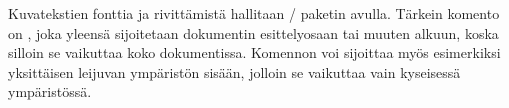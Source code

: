 \begin{koodilohkosis}
\end{koodilohkosis}

\noindent
Kuvatekstien fonttia ja rivittämistä hallitaan \-/
paketin avulla. Tärkein komento on , joka yleensä
sijoitetaan dokumentin esittelyosaan tai muuten alkuun, koska silloin se
vaikuttaa koko dokumentissa. Komennon voi sijoittaa myös esimerkiksi
yksittäisen leijuvan ympäristön sisään, jolloin se vaikuttaa vain
kyseisessä ympäristössä.

\begin{koodilohkosis}
\captionsetup[tyyppi]{valitsimet}
\end{koodilohkosis}

